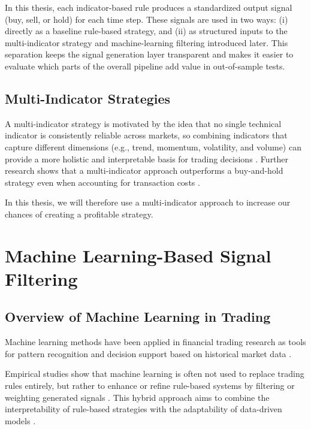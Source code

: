 In this thesis, each indicator-based rule produces a standardized output signal (buy, sell, or hold) for each time step. These signals are used in two ways: (i) directly as a baseline rule-based strategy, and (ii) as structured inputs to the multi-indicator strategy and machine-learning filtering introduced later. This separation keeps the signal generation layer transparent and makes it easier to evaluate which parts of the overall pipeline add value in out-of-sample tests.



\subsection{Multi-Indicator Strategies}

A multi-indicator strategy is motivated by the idea that no single technical indicator is consistently reliable across markets, so combining indicators that capture different dimensions (e.g., trend, momentum, volatility, and volume) can provide a more holistic and interpretable basis for trading decisions \citep{10795119}. Further research shows that a multi-indicator approach outperforms a buy-and-hold strategy even when accounting for transaction costs \citep{lento2007profitability}.

In this thesis, we will therefore use a multi-indicator approach to increase our chances of creating a profitable strategy.


\section{Machine Learning-Based Signal Filtering}
\label{sec:ml_filtering}

\subsection{Overview of Machine Learning in Trading}

Machine learning methods have been applied in financial trading research as tools for pattern recognition and decision support based on historical market data \citep{dakalbab2024artificial}.

Empirical studies show that machine learning is often not used to replace trading rules entirely, but rather to enhance or refine rule-based systems by filtering or weighting generated signals \citep{hu2015stock}.
This hybrid approach aims to combine the interpretability of rule-based strategies with the adaptability of data-driven models \citep{dakalbab2024artificial}.

